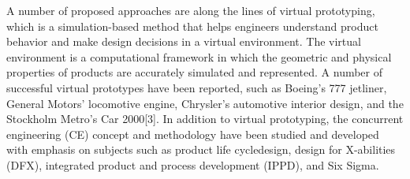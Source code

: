 A number of proposed approaches are along the lines of virtual prototyping,  which  is  a  simulation-based  method  that  helps  engineers 
understand product behavior and make design decisions in a virtual environment. The virtual environment is a computational framework in which the geometric and physical properties of products are accurately simulated and represented. A number of successful virtual prototypes have  been  reported, such as  Boeing’s 777 jetliner,  General Motors’ locomotive engine, Chrysler’s automotive interior design, and the Stockholm Metro’s Car 2000[3]. In addition to virtual prototyping, the concurrent engineering (CE) concept and methodology have been studied and developed with emphasis on subjects such as product life cycledesign, design for X-abilities (DFX), integrated product and process development (IPPD), and Six Sigma.
